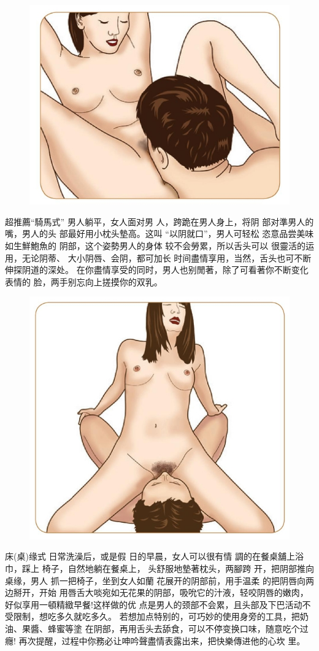\documentclass[12pt,UTF8]{ctexbook}
\begin{document}
\begin{figure}[htbp]
	\centering
	\includegraphics[width=0.7\linewidth]{21}
	\caption{}
	\label{fig:1}
\end{figure}

超推薦“騎馬式”
男人躺平，女人面对男
人，跨跪在男人身上，将阴
部对準男人的嘴，男人的头
部最好用小枕头墊高。这叫
“以阴就口”，男人可轻松
恣意品尝美味如生鮮鮑魚的
阴部，这个姿勢男人的身体
较不会勞累，所以舌头可以
很靈活的运用，无论阴蒂、
大小阴唇、会阴，都可加长
时间盡情享用，当然，舌头也可不断伸探阴道的深处。
在你盡情享受的同时，男人也别閒著，除了可看著你不断变化表情的
脸，两手别忘向上搓摸你的双乳。

\begin{figure}[htbp]
	\centering
	\includegraphics[width=0.7\linewidth]{22}
	\caption{}
	\label{fig:1}
\end{figure}

床(桌)缘式
日常洗澡后，或是假
日的早晨，女人可以很有情
調的在餐桌舖上浴巾，踩上
椅子，自然地躺在餐桌上，
头舒服地墊著枕头，两腳跨
开，把阴部推向桌缘，男人
抓一把椅子，坐到女人如蘭
花展开的阴部前，用手温柔
的把阴唇向两边掰开，开始
用唇舌大啖宛如无花果的阴部，吸吮它的汁液，轻咬阴唇的嫩肉，好似享用一頓精緻早餐!这样做的优
点是男人的颈部不会累，且头部及下巴活动不受限制，想吃多久就吃多久。
若想加点特别的，可巧妙的使用身旁的工具，把奶油、果醬、蜂蜜等塗
在阴部，再用舌头去舔食，可以不停变换口味，随意吃个过癮!
再次提醒，过程中你務必让呻吟聲盡情表露出来，把快樂傳进他的心坎
里。
\end{document}
